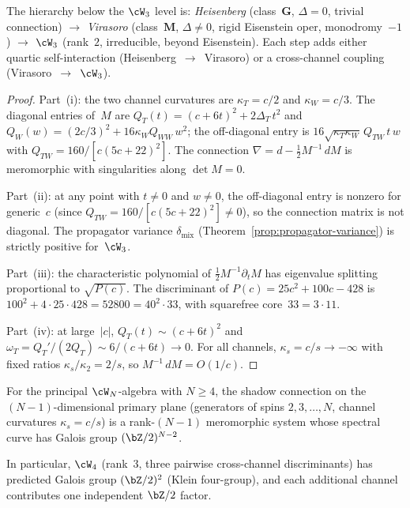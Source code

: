 \begin{proposition}
The hierarchy below the $\cW_3$ level is:
\emph{Heisenberg} \textup{(}class~$\mathbf{G}$,
$\Delta = 0$, trivial connection\textup{)}
$\to$ \emph{Virasoro} \textup{(}class~$\mathbf{M}$,
$\Delta \neq 0$, rigid Eisenstein oper, monodromy~$-1$\textup{)}
$\to$ \emph{$\cW_3$} \textup{(}rank~$2$, irreducible,
beyond Eisenstein\textup{)}.
Each step adds either quartic self-interaction
\textup{(}Heisenberg~$\to$~Virasoro\textup{)} or a cross-channel
coupling \textup{(}Virasoro~$\to$~$\cW_3$\textup{)}.
\end{proposition}

\begin{proof}
Part~(i): the two channel curvatures are
$\kappa_T = c/2$ and $\kappa_W = c/3$.
The diagonal entries of~$M$ are
$Q_T(t) = (c + 6t)^2 + 2\Delta_T\,t^2$
and $Q_W(w) = (2c/3)^2 + 16\kappa_W Q_{WW}\,w^2$;
the off-diagonal entry is
$16\sqrt{\kappa_T\kappa_W}\,Q_{TW}\,t\,w$
with $Q_{TW} = 160/[c(5c{+}22)^2]$.
The connection $\nabla = d - \tfrac{1}{2}M^{-1}\,dM$ is
meromorphic with singularities along $\det M = 0$.

Part~(ii): at any point with $t \neq 0$ and $w \neq 0$,
the off-diagonal entry is nonzero for generic~$c$
(since $Q_{TW} = 160/[c(5c{+}22)^2] \neq 0$), so the
connection matrix is not diagonal.
The propagator variance $\delta_{\mathrm{mix}}$
(Theorem~\ref{prop:propagator-variance}) is
strictly positive for~$\cW_3$.

Part~(iii): the characteristic polynomial of
$\tfrac{1}{2}M^{-1}\partial_t M$ has eigenvalue splitting
proportional to $\sqrt{P(c)}$. The discriminant of
$P(c) = 25c^2 + 100c - 428$ is
$100^2 + 4 \cdot 25 \cdot 428 = 52800 = 40^2 \cdot 33$,
with squarefree core~$33 = 3 \cdot 11$.

Part~(iv): at large~$|c|$,
$Q_T(t) \sim (c + 6t)^2$ and
$\omega_T = Q_T'/(2Q_T) \sim 6/(c + 6t) \to 0$.
For all channels, $\kappa_s = c/s \to -\infty$ with
fixed ratios $\kappa_s/\kappa_2 = 2/s$, so
$M^{-1}\,dM = O(1/c)$.
\end{proof}

\begin{conjecture}
\label{conj:wn-shadow-galois}
For the principal $\cW_N$-algebra with $N \ge 4$, the shadow
connection on the $(N{-}1)$-dimensional primary plane
\textup{(}generators of spins $2, 3, \ldots, N$, channel
curvatures $\kappa_s = c/s$\textup{)} is a rank-$(N{-}1)$
meromorphic system whose spectral curve has Galois group
$(\bZ/2)^{N-2}$.

In particular, $\cW_4$ \textup{(}rank~$3$, three pairwise
cross-channel discriminants\textup{)} has predicted Galois
group $(\bZ/2)^2$ \textup{(}Klein four-group\textup{)},
and each additional channel contributes one independent
$\bZ/2$ factor.
\end{conjecture}

